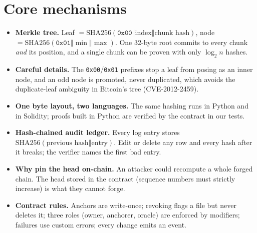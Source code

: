 \documentclass[10pt,a4paper]{article}
\newcommand{\cat}{\ensuremath{\mathbin{\Vert}}}
\begin{document}
\section{Core mechanisms}
\begin{itemize}
  \item \textbf{Merkle tree.} Leaf $=\mathrm{SHA256}(\texttt{0x00}\cat \mbox{index}\cat \mbox{chunk hash})$,
        node $=\mathrm{SHA256}(\texttt{0x01}\cat\min\cat\max)$. One 32-byte root commits to every chunk \emph{and} its position,
        and a single chunk can be proven with only $\log_2 n$ hashes.
  \item \textbf{Careful details.} The \texttt{0x00}/\texttt{0x01} prefixes stop a leaf from posing as an inner node, and an odd
        node is promoted, never duplicated, which avoids the duplicate-leaf ambiguity in Bitcoin's tree (CVE-2012-2459).
  \item \textbf{One byte layout, two languages.} The same hashing runs in Python and in Solidity; proofs built in Python are
        verified by the contract in our tests.
  \item \textbf{Hash-chained audit ledger.} Every log entry stores $\mathrm{SHA256}(\mbox{previous hash}\cat\mbox{entry})$.
        Edit or delete any row and every hash after it breaks; the verifier names the first bad entry.
  \item \textbf{Why pin the head on-chain.} An attacker could recompute a whole forged chain. The head stored in the contract
        (sequence numbers must strictly increase) is what they cannot forge.
  \item \textbf{Contract rules.} Anchors are write-once; revoking flags a file but never deletes it; three roles (owner,
        anchorer, oracle) are enforced by modifiers; failures use custom errors; every change emits an event.
\end{itemize}
\end{document}
